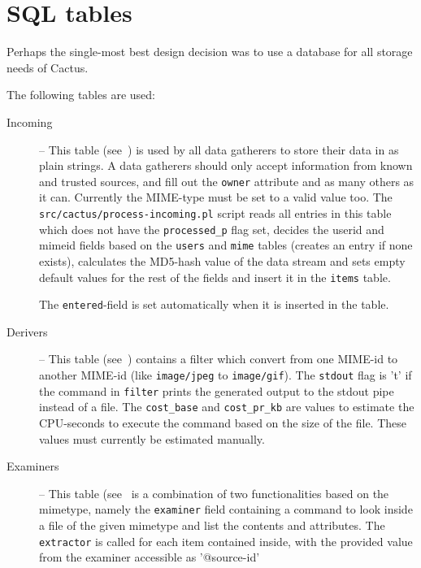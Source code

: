 \section{SQL tables}

Perhaps the single-most best design decision was to use a database for
all storage needs of Cactus.

The following tables are used:


\begin{description}

\item[Incoming] --
  This table (see~) is used
  by all data gatherers to store their data in as plain strings.  A
  data gatherers should only accept information from known and trusted
  sources, and fill out the \texttt{owner} attribute and as many
  others as it can.  Currently the MIME-type must be set to a valid
  value too.  The \texttt{src/cactus/process-incoming.pl} script reads
  all entries in this table which does not have the
  \texttt{processed\_p} flag set, decides the userid and mimeid fields
  based on the \texttt{users} and \texttt{mime} tables (creates an
  entry if none exists), calculates the MD5-hash value of the data
  stream and sets empty default values for the rest of the fields and
  insert it in the \texttt{items} table.

  The \texttt{entered}-field is set automatically when it is inserted
  in the table.



%  
  
\item[Derivers] -- This table (see~) contains
  a filter which convert from one MIME-id to another MIME-id (like
  \texttt{image/jpeg} to \texttt{image/gif}).  The \texttt{stdout}
  flag is 't' if the command in \texttt{filter} prints the generated
  output to the stdout pipe instead of a file.  The
  \texttt{cost\_base} and \texttt{cost\_pr\_kb} are values to estimate
  the CPU-seconds to execute the command based on the size of the
  file.  These values must currently be estimated manually.



\item[Examiners] -- This table (see~ is a
combination of two functionalities based on the mimetype, namely the
\texttt{examiner} field containing a command to look inside a file of
the given mimetype and list the contents and attributes.  The
\texttt{extractor} is called for each item contained inside, with the
provided value from the examiner accessible as '{@source-id}'


\end{description}
